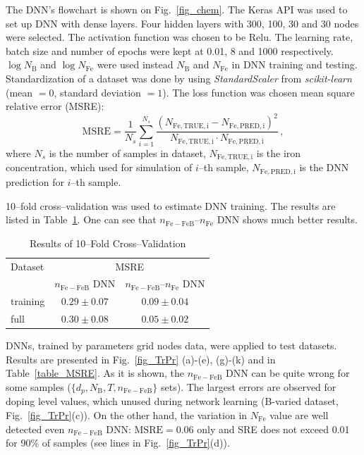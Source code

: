 \documentclass[journal]{IEEEtran}
\begin{document}
The DNN's flowchart is shown on Fig.~\ref{fig_chem}.
The Keras API \cite{Keras} was used to set up DNN with dense layers.
Four hidden  layers with 300, 100, 30 and 30 nodes were selected.
The activation function was chosen to be Relu.
The learning rate, batch size and number of epochs were kept at 0.01, 8 and 1000 respectively.
$\log N_\mathrm{B}$ and $\log N_\mathrm{Fe}$ were used instead
$N_\mathrm{B}$ and $N_\mathrm{Fe}$ in DNN training and testing.
Standardization of a dataset was done by using \emph{StandardScaler} from \emph{scikit-learn}
(mean $=0$, standard deviation  $=1$).
The loss function was chosen mean square relative error (MSRE):
\begin{equation}
\label{eqMSRE}
    \mathrm{MSRE}=\frac{1}{N_s}\sum_{i=1}^{N_s}\frac{(N_\mathrm{Fe,TRUE,i}-N_\mathrm{Fe,PRED,i})^2}{N_\mathrm{Fe,TRUE,i}\cdot N_\mathrm{Fe,PRED,i}}\,,
\end{equation}
where
$N_s$ is the number of samples in dataset,
$N_\mathrm{Fe,TRUE,i}$ is the iron concentration, which used for simulation of $i$--th sample,
$N_\mathrm{Fe,PRED,i}$ is the DNN prediction for $i$--th sample.


10--fold cross--validation was used to estimate DNN training.
The results are listed in Table~\ref{table_CV}.
One can see that $n_\mathrm{Fe-FeB}$--$n_\mathrm{Fe}$ DNN
shows much better results.



\begin{table}[!t]
\renewcommand{\arraystretch}{1.3}
\caption{Results of 10--Fold Cross--Validation}
\label{table_CV}
\centering
\begin{tabular}{lcc}
\hline
Dataset & \multicolumn{2}{c}{MSRE}\\
 & $n_\mathrm{Fe-FeB}$ DNN &$n_\mathrm{Fe-FeB}$--$n_\mathrm{Fe}$ DNN\\
\hline
training&$0.29\pm0.07$&$0.09\pm0.04$ \\
full&$0.30\pm0.08$& $0.05\pm0.02$\\
\hline
\end{tabular}
\end{table}

DNNs, trained by parameters grid nodes data, were applied to test datasets.
Results are presented in Fig.~\ref{fig_TrPr} (a)-(e), (g)-(k) and in Table~\ref{table_MSRE}.
As it is shown, the $n_\mathrm{Fe-FeB}$ DNN can be quite wrong for some samples 
($\{d_p,N_\mathrm{B},T,n_\mathrm{Fe-FeB}\}$ sets).
The largest errors are observed for doping level values, which unused during  network learning
(B-varied dataset, Fig.~\ref{fig_TrPr}(c)).
On the other hand, the variation in $N_\mathrm{Fe}$ value are well detected even $n_\mathrm{Fe-FeB}$ DNN:
$\mathrm{MSRE}=0.06$ only and SRE does not exceed 0.01 for 90\% of samples (see lines in Fig.~\ref{fig_TrPr}(d)).
\end{document}
